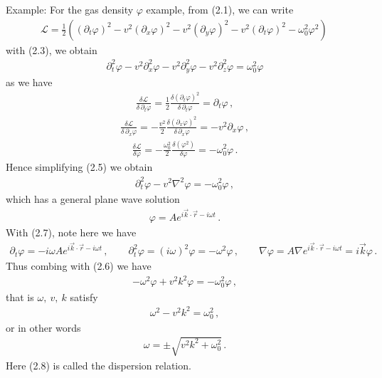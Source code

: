 \documentclass[11pt, onesided]{book}
\theoremstyle{break}
\theoremstyle{break}
\newcommand{\pd}{\partial}
\newcommand{\example}{\color{green}Example: \color{black}}
\begin{document}
\example For the gas density $\varphi$ example, from (2.1), we can write
\begin{align*}
\mathcal{L} = \frac{1}{2}\left( (\pd_t \varphi)^2 - v^2 (\pd_x \varphi)^2 - v^2 (\pd_y \varphi)^2 - v^2(\pd_t \varphi)^2 - \omega_0^2 \varphi^2\right)\,
\end{align*}
with (2.3), we obtain
\begin{align}
\pd_t^2 \varphi -v^2 \pd_x^2 \varphi - v^2 \pd_y^2 \varphi - v^2 \pd_z^2 \varphi = \omega_0^2 \varphi
\end{align}
as we have
\begin{align*}
\frac{\delta \mathcal{L}}{\delta\, \pd_t \varphi} = \frac{1}{2} \frac{\delta (\pd_t \varphi)^2}{\delta \, \pd_t \varphi} = \pd_t \varphi\,,
\end{align*}
\begin{align*}
\frac{\delta \mathcal{L}}{\delta\, \pd_x \varphi} = -\frac{v^2}{2} \frac{\delta (\pd_x \varphi)^2}{\delta \, \pd_x\varphi} = -v^2 \pd_x \varphi\,,
\end{align*}
\begin{align*}
\frac{\delta \mathcal{L}}{\delta \varphi}  =-\frac{\omega_0^2}{2}\frac{\delta (\varphi^2)}{\delta \varphi} = -\omega_0^2 \varphi\,.
\end{align*}
Hence simplifying (2.5) we obtain
\begin{align}
\pd_t^2 \varphi - v^2 \nabla^2 \varphi = -\omega_0^2 \varphi\,,
\end{align}
which has a general plane wave solution
\begin{align}
\varphi = Ae^{i\vec{k}\cdot \vec{r} - i\omega t}\,.
\end{align}
With (2.7), note here we have
\begin{align*}
\pd_t \varphi = -i\omega A e^{i\vec{k}\cdot \vec{r} - i\omega t}\,, \qquad 
\pd_t^2 \varphi = (i\omega)^2 \varphi = -\omega^2 \varphi\,, \qquad
\nabla \varphi = A \nabla e^{i\vec{k}\cdot \vec{r} - i\omega t} =i \vec{k}\varphi\,.
\end{align*}
Thus combing with (2.6) we have
\begin{align*}
-\omega^2 \varphi + v^2 k^2 \varphi = -\omega_0^2 \varphi\,,
\end{align*}
that is $\omega,\ v,\ k$ satisfy
\begin{align*}
\omega^2 - v^2 k^2 = \omega_0^2\,,
\end{align*}
or in other words
\begin{align}
\omega = \pm \sqrt{v^2 k^2  + \omega_0^2}\,.
\end{align}
Here (2.8) is called the dispersion relation.\\
\end{document}
